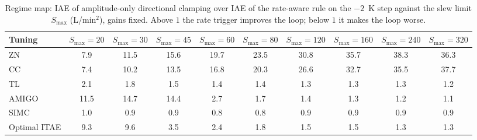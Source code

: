 \begin{table}[t]
\centering
\footnotesize
\setlength{\tabcolsep}{3pt}
\caption{Regime map: IAE of amplitude-only directional clamping over IAE of the rate-aware rule on the $-2$~K step against the slew limit $S_{\max}$ (L/min$^2$), gains fixed. Above $1$ the rate trigger improves the loop; below $1$ it makes the loop worse.}
\label{tab:smax_ratio}
\begin{tabular}{lccccccccc}
\toprule
Tuning & $S_{\max}=20$ & $S_{\max}=30$ & $S_{\max}=45$ & $S_{\max}=60$ & $S_{\max}=80$ & $S_{\max}=120$ & $S_{\max}=160$ & $S_{\max}=240$ & $S_{\max}=320$ \\
\midrule
ZN & 7.9 & 11.5 & 15.6 & 19.7 & 23.5 & 30.8 & 35.7 & 38.3 & 36.3 \\
CC & 7.4 & 10.2 & 13.5 & 16.8 & 20.3 & 26.6 & 32.7 & 35.5 & 37.7 \\
TL & 2.1 & 1.8 & 1.5 & 1.4 & 1.4 & 1.3 & 1.3 & 1.3 & 1.2 \\
AMIGO & 11.5 & 14.7 & 14.4 & 2.7 & 1.7 & 1.4 & 1.3 & 1.2 & 1.1 \\
SIMC & 1.0 & 0.9 & 0.9 & 0.8 & 0.8 & 0.9 & 0.9 & 0.9 & 0.9 \\
Optimal ITAE & 9.3 & 9.6 & 3.5 & 2.4 & 1.8 & 1.5 & 1.5 & 1.3 & 1.3 \\
\bottomrule
\end{tabular}
\end{table}
